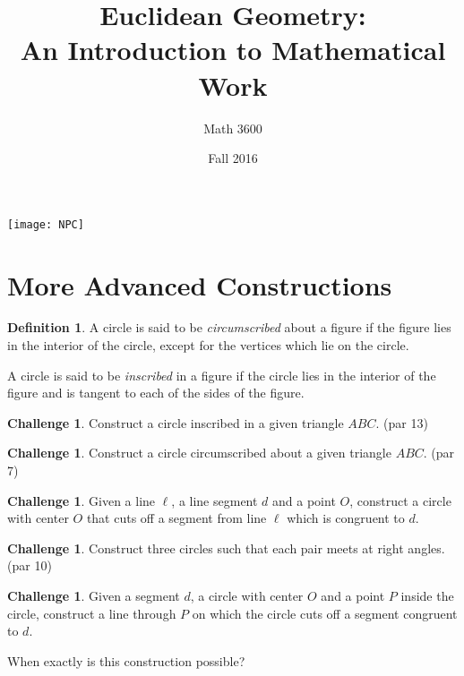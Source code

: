 \documentclass{tufte-handout}
\title{Euclidean Geometry:\\An Introduction to Mathematical Work}
\author[]{Math 3600}
\date{Fall 2016}
\theoremstyle{definition}
\newtheorem*{definition}{Definition}
\newtheorem{challenge}[problem]{Challenge}
\begin{document}
\maketitle

\begin{marginfigure}
    \texttt{[image: NPC]}
\end{marginfigure}

\setcounter{section}{12}
\section{More Advanced Constructions}

\begin{definition}\label{defn:circumscribed}
A circle is said to be \emph{circumscribed} about a figure if the figure lies in the interior of the circle, except for the vertices which lie on the circle.

A circle is said to be \emph{inscribed} in a figure if the circle lies in the interior of the figure and is tangent to each of the sides of the figure.
\end{definition}

\begin{challenge}\label{chal:triangle-inscribe-circle}
Construct a circle inscribed in a given triangle $ABC$. (par 13)
\end{challenge}

\begin{challenge}\label{chal:triangle-circumscribe-circle}
Construct a circle circumscribed about a given triangle $ABC$. (par 7)
\end{challenge}



\begin{challenge}\label{chal:cut-segment-by-circle}
Given a line $\ell$, a line segment $d$ and a point $O$, construct a circle with center $O$ that cuts off a segment from line $\ell$ which is congruent to $d$.
\end{challenge}



\begin{challenge}\label{chal:three-perp-circles}
Construct three circles such that each pair meets at right angles. (par 10)
\end{challenge}

\begin{challenge}\label{chal:cut-circle-by-segment}
Given a segment $d$, a circle with center $O$ and a point $P$ inside the circle, construct a line through $P$ on which the circle cuts off a segment congruent to $d$.

When exactly is this construction possible?
\end{challenge}
\end{document}
